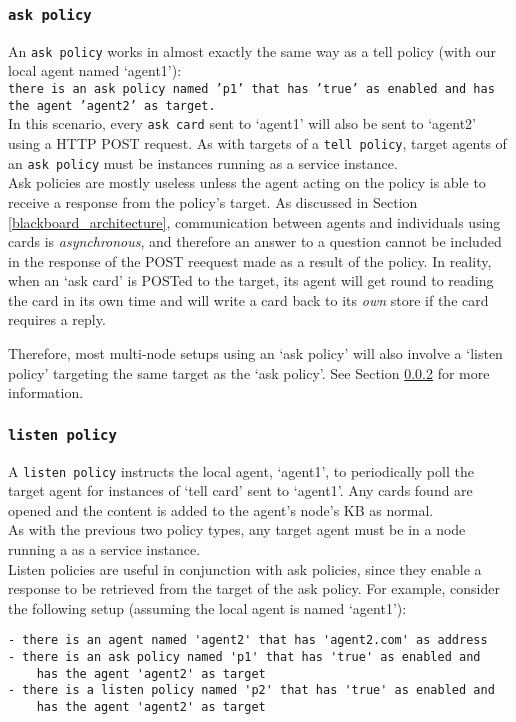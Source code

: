\documentclass{scrartcl}
\begin{document}
\subsubsection{\texttt{ask policy}}
An \texttt{ask policy} works in almost exactly the same way as a tell policy (with our local agent named `agent1'):\\
\texttt{there is an ask policy named 'p1' that has 'true' as enabled and has the agent 'agent2' as target.}\\

In this scenario, every \texttt{ask card} sent to `agent1' will also be sent to `agent2' using a HTTP POST request. As with targets of a \texttt{tell policy}, target agents of an \texttt{ask policy} must be instances running as a service instance.\\

Ask policies are mostly useless unless the agent acting on the policy is able to receive a response from the policy's target. As discussed in Section \ref{blackboard_architecture}, communication between agents and individuals using cards is \textit{asynchronous}, and therefore an answer to a question cannot be included in the response of the POST reequest made as a result of the policy. In reality, when an `ask card' is POSTed to the target, its agent will get round to reading the card in its own time and will write a card back to its \textit{own} store if the card requires a reply.

Therefore, most multi-node setups using an `ask policy' will also involve a `listen policy' targeting the same target as the `ask policy'. See Section \ref{listen_policy} for more information.

\subsubsection{\texttt{listen policy}}
\label{listen_policy}
A \texttt{listen policy} instructs the local agent, `agent1', to periodically poll the target agent for instances of `tell card' sent to `agent1'. Any cards found are opened and the content is added to the agent's node's KB as normal.\\

As with the previous two policy types, any target agent must be in a node running a as a service instance.\\

Listen policies are useful in conjunction with ask policies, since they enable a response to be retrieved from the target of the ask policy. For example, consider the following setup (assuming the local agent is named `agent1'):\\
\begin{verbatim}
- there is an agent named 'agent2' that has 'agent2.com' as address
- there is an ask policy named 'p1' that has 'true' as enabled and
    has the agent 'agent2' as target
- there is a listen policy named 'p2' that has 'true' as enabled and
    has the agent 'agent2' as target
\end{verbatim}
\end{document}
